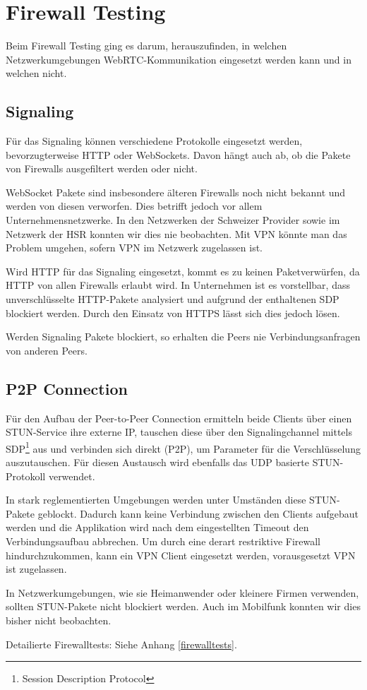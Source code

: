 	
	
\chapter{Firewall Testing}
	Beim Firewall Testing ging es darum, herauszufinden, in welchen Netzwerkumgebungen WebRTC-Kommunikation eingesetzt werden kann und in welchen nicht.
	
	
	\section{Signaling}
		Für das Signaling können verschiedene Protokolle eingesetzt werden,
		bevorzugterweise HTTP oder WebSockets. Davon hängt auch ab, ob die Pakete von
		Firewalls ausgefiltert werden oder nicht.
		
		WebSocket Pakete sind insbesondere älteren Firewalls noch nicht bekannt und
		werden von diesen verworfen. Dies betrifft jedoch vor allem Unternehmensnetzwerke.
		In den Netzwerken der Schweizer Provider sowie im Netzwerk der HSR konnten wir dies nie beobachten.
		Mit VPN könnte man das Problem umgehen, sofern VPN im Netzwerk zugelassen ist.
		
		Wird HTTP für das Signaling eingesetzt, kommt es zu keinen Paketverwürfen, da HTTP von allen Firewalls erlaubt wird.
		In Unternehmen ist es vorstellbar, dass unverschlüsselte HTTP-Pakete
		analysiert und aufgrund der enthaltenen SDP blockiert werden. Durch den Einsatz von HTTPS lässt sich dies jedoch lösen.
		
		Werden Signaling Pakete blockiert, so erhalten die Peers nie Verbindungsanfragen von anderen Peers.
		

	\section{P2P Connection}
		Für den Aufbau der Peer-to-Peer Connection ermitteln beide Clients über einen
		STUN-Service ihre externe IP, tauschen diese über den Signalingchannel
		mittels SDP\footnote{Session Description Protocol} aus und verbinden sich
		direkt (P2P), um Parameter für die Verschlüsselung auszutauschen. Für diesen
		Austausch wird ebenfalls das UDP basierte STUN-Protokoll verwendet.
		
		In stark reglementierten Umgebungen werden unter Umständen diese STUN-Pakete
		geblockt. Dadurch kann keine Verbindung zwischen den Clients aufgebaut werden und die Applikation wird nach dem eingestellten Timeout den Verbindungsaufbau abbrechen. 
		Um durch eine derart restriktive Firewall hindurchzukommen, kann ein VPN
		Client eingesetzt werden, vorausgesetzt VPN ist zugelassen.
		
		In Netzwerkumgebungen, wie sie Heimanwender oder kleinere Firmen verwenden,
		sollten STUN-Pakete nicht blockiert werden. Auch im Mobilfunk konnten wir dies
		bisher nicht beobachten.
	
		Detailierte Firewalltests: Siehe Anhang \ref{firewalltests}.
		
		
